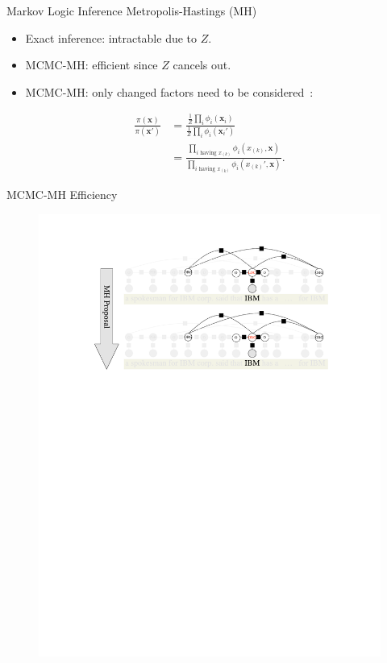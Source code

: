 \documentclass[onlymath,xcolor=pdftex,dvipsnames,table]{beamer}
\newcommand{\head}[1]{{\large\color{OliveGreen}#1\\[5pt]}}
\begin{document}
\begin{frame}{Markov Logic Inference}
\head{Metropolis-Hastings (MH)}
\begin{itemize}
  \item Exact inference: intractable due to $Z$.
  \item MCMC-MH: efficient since $Z$ cancels out.
  \item MCMC-MH: only changed factors need to be considered~\cite{wick2010scalable}:
\end{itemize}
\begin{align}
\frac{\pi(\mathbf{x})}{\pi(\mathbf{x'})}&=\frac{\frac{1}{Z}\prod_i\phi_i(\mathbf{x}_i)}{\frac{1}{Z}\prod_i\phi_i(\mathbf{x}_i')}\nonumber\\
&=\frac{\prod_{i\text{ having }x_{(k)}}\phi_i(x_{(k)},\mathbf{x})}{\prod_{i\text{ having }x_{(k)}}\phi_i(x_{(k)}',\mathbf{x})}.\nonumber
\end{align}
\end{frame}


\begin{frame}{MCMC-MH Efficiency}
\begin{figure}
  \centering
  \includegraphics[clip,trim=50pt 280pt 50pt 30pt,width=\textwidth]{mcmc.pdf}
\end{figure}
\end{frame}
\end{document}

